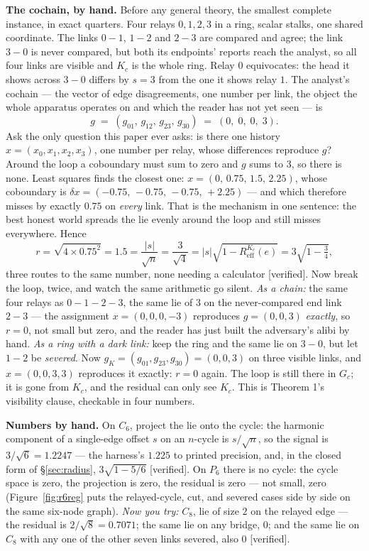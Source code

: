 \documentclass[11pt,a4paper]{article}
\begin{document}
\textbf{The cochain, by hand.} Before any general theory, the smallest complete instance, in exact quarters. Four relays
$0,1,2,3$ in a ring, scalar stalks, one shared coordinate. The links $0\!-\!1$, $1\!-\!2$ and $2\!-\!3$ are compared and
agree; the link $3\!-\!0$ is never compared, but both its endpoints' reports reach the analyst, so all four links are
visible and $K_c$ is the whole ring. Relay $0$ equivocates: the head it shows across $3\!-\!0$ differs by $s=3$ from the one
it shows relay $1$. The analyst's cochain --- the vector of edge disagreements, one number per link, the object the whole
apparatus operates on and which the reader has not yet seen --- is
\[
g \;=\; (g_{01},\,g_{12},\,g_{23},\,g_{30}) \;=\; (0,\;0,\;0,\;3).
\]
Ask the only question this paper ever asks: is there one history $x=(x_0,x_1,x_2,x_3)$, one number per relay, whose
differences reproduce $g$? Around the loop a coboundary must sum to zero and $g$ sums to $3$, so there is none. Least
squares finds the closest one: $x=(0,\,0.75,\,1.5,\,2.25)$, whose coboundary is
$\delta x=(-0.75,\,-0.75,\,-0.75,\,+2.25)$ --- and which therefore misses by exactly $0.75$ on \emph{every} link. That is
the mechanism in one sentence: the best honest world spreads the lie evenly around the loop and still misses everywhere.
Hence
\[
r=\sqrt{4\times 0.75^{2}}=1.5=\frac{|s|}{\sqrt n}=\frac{3}{\sqrt4}
 =|s|\sqrt{1-R^{K_c}_{\mathrm{eff}}(e)}=3\sqrt{1-\tfrac34},
\]
three routes to the same number, none needing a calculator [verified]. Now break the loop, twice, and watch the same
arithmetic go silent. \emph{As a chain:} the same four relays as $0\!-\!1\!-\!2\!-\!3$, the same lie of $3$ on the
never-compared end link $2\!-\!3$ --- the assignment $x=(0,0,0,-3)$ reproduces $g=(0,0,3)$ \emph{exactly}, so $r=0$, not
small but zero, and the reader has just built the adversary's alibi by hand. \emph{As a ring with a dark link:} keep the
ring and the same lie on $3\!-\!0$, but let $1\!-\!2$ be \emph{severed}. Now $g_K=(g_{01},g_{23},g_{30})=(0,0,3)$ on three
visible links, and $x=(0,0,3,3)$ reproduces it exactly: $r=0$ again. The loop is still there in $G_c$; it is gone from
$K_c$, and the residual can only see $K_c$. This is Theorem 1's visibility clause, checkable in four numbers.

\textbf{Numbers by hand.} On $C_6$, project the lie onto the cycle: the harmonic component of a single-edge offset $s$ on an
$n$-cycle is $s/\sqrt{n}$, so the signal is $3/\sqrt{6}=1.2247$ --- the harness's $1.225$ to printed precision, and, in the
closed form of \S\ref{sec:radius}, $3\sqrt{1-5/6}$ [verified]. On $P_6$ there is no cycle: the cycle space is zero, the
projection is zero, the residual is zero --- not small, zero (Figure~\ref{fig:r6reg} puts the relayed-cycle, cut, and
severed cases side by side on the same six-node graph). \emph{Now you try:} $C_8$, lie of size $2$ on the relayed
edge --- the residual is $2/\sqrt{8}=0.7071$; the same lie on any bridge, $0$; and the same lie on $C_8$ with any one of the
other seven links severed, also $0$ [verified].
\end{document}
